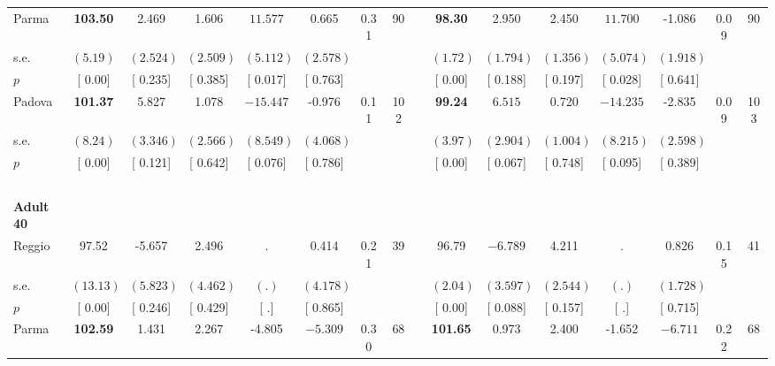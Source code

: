 \begin{longtable}{L{8em} c c c c c c c p{1em} c c c c c c c}
\quad \quad \quad Parma& \textbf{   103.50} &     2.469 &     1.606 & $ \mathbf{   11.577}$ &     0.665 &      0.31 &        90 & & \textbf{    98.30} &     2.950 &     2.450 & $ \mathbf{   11.700}$ &    -1.086 &      0.09 &        90  \\*
\quad \quad \quad \quad s.e.& $ (     5.19)$ & $ (    2.524)$ & $ (    2.509)$ & $ (    5.112)$ & $ (    2.578)$ & & & & $ (     1.72)$ & $ (    1.794)$ & $ (    1.356)$ & $ (    5.074)$ & $ (    1.918)$ & &  \\*
\quad \quad \quad \quad $ p$ & [     0.00] & [    0.235] & [    0.385] & [    0.017] & [    0.763] & & & & [     0.00] & [    0.188] & [    0.197] & [    0.028] & [    0.641] & &  \\[1em]
\quad \quad \quad Padova& \textbf{   101.37} &     5.827 &     1.078 & $ \mathbf{  -15.447}$ &    -0.976 &      0.11 &       102 & & \textbf{    99.24} & $ \mathbf{    6.515}$ &     0.720 & $ \mathbf{  -14.235}$ &    -2.835 &      0.09 &       103  \\*
\quad \quad \quad \quad s.e.& $ (     8.24)$ & $ (    3.346)$ & $ (    2.566)$ & $ (    8.549)$ & $ (    4.068)$ & & & & $ (     3.97)$ & $ (    2.904)$ & $ (    1.004)$ & $ (    8.215)$ & $ (    2.598)$ & &  \\*
\quad \quad \quad \quad $ p$ & [     0.00] & [    0.121] & [    0.642] & [    0.076] & [    0.786] & & & & [     0.00] & [    0.067] & [    0.748] & [    0.095] & [    0.389] & &  \\[1em]
~\\[1em]
\quad \quad \textbf{Adult 40} & & & & & & & & & & & & & & & \\* 
\quad \quad \quad Reggio& 97.52 &    -5.657 &     2.496 &         . &     0.414 &      0.21 &        39 & & 96.79 & $ \mathbf{   -6.789}$ &     4.211 &         . &     0.826 &      0.15 &        41  \\*
\quad \quad \quad \quad s.e.& $ (    13.13)$ & $ (    5.823)$ & $ (    4.462)$ & $ (        .)$ & $ (    4.178)$ & & & & $ (     2.04)$ & $ (    3.597)$ & $ (    2.544)$ & $ (        .)$ & $ (    1.728)$ & &  \\*
\quad \quad \quad \quad $ p$ & [     0.00] & [    0.246] & [    0.429] & [        .] & [    0.865] & & & & [     0.00] & [    0.088] & [    0.157] & [        .] & [    0.715] & &  \\[1em]
\quad \quad \quad Parma& \textbf{   102.59} &     1.431 &     2.267 &    -4.805 & $ \mathbf{   -5.309}$ &      0.30 &        68 & & \textbf{   101.65} &     0.973 &     2.400 &    -1.652 & $ \mathbf{   -6.711}$ &      0.22 &        68  \\*

\end{longtable}
